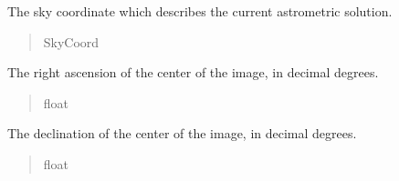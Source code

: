 \documentclass[letterpaper,11pt,english]{sphinxmanual}
\begin{document}
\begin{savenotes}
\begin{fulllineitems}
\begin{savenotes}\begin{fulllineitems}
\label{\detokenize{code/opihiexarata.astrometry.solution:opihiexarata.astrometry.solution.AstrometricSolution.skycoord}}
\pysigstartsignatures
{}
\pysigstopsignatures
\sphinxAtStartPar
The sky coordinate which describes the current astrometric solution.
\begin{quote}\begin{description}
\sphinxAtStartPar
SkyCoord

\end{description}\end{quote}

\end{fulllineitems}\end{savenotes}


\begin{savenotes}\begin{fulllineitems}
\label{\detokenize{code/opihiexarata.astrometry.solution:opihiexarata.astrometry.solution.AstrometricSolution.ra}}
\pysigstartsignatures
{}
\pysigstopsignatures
\sphinxAtStartPar
The right ascension of the center of the image, in decimal degrees.
\begin{quote}\begin{description}
\sphinxAtStartPar
float

\end{description}\end{quote}

\end{fulllineitems}\end{savenotes}


\begin{savenotes}\begin{fulllineitems}
\label{\detokenize{code/opihiexarata.astrometry.solution:opihiexarata.astrometry.solution.AstrometricSolution.dec}}
\pysigstartsignatures
{}
\pysigstopsignatures
\sphinxAtStartPar
The declination of the center of the image, in decimal degrees.
\begin{quote}\begin{description}
\sphinxAtStartPar
float


\end{description}
\end{quote}
\end{fulllineitems}
\end{savenotes}
\end{fulllineitems}
\end{savenotes}
\end{document}
